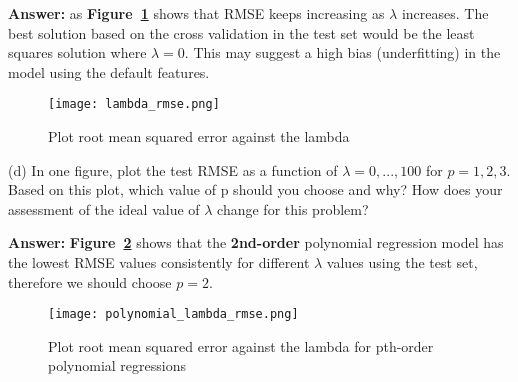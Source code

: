 \documentclass[11pt]{report}
\begin{document}
\justify
\textbf{Answer:} as \textbf{Figure~\ref{fig:ambda_rmse}} shows that RMSE keeps increasing as $\lambda$ increases. The best solution based on the cross validation in the test set would be the least squares solution where $\lambda = 0$. This may suggest a high bias (underfitting) in the model using the default features. 


\begin{figure}[h]
\texttt{[image: lambda\_rmse.png]}
\centering
\caption{Plot root mean squared error against the lambda}
\label{fig:ambda_rmse}
\end{figure}


\justify
(d) In one figure, plot the test RMSE as a function of $\lambda = 0, . . . , 100$ for $ p = 1,  2, 3$. Based on this plot, which value of p should you choose and why? How does your assessment of the ideal value of $\lambda$ change for this problem?

\justify
\textbf{Answer:}  \textbf{Figure~\ref{fig:polynomial_lambda_rmse}} shows that the \textbf{2nd-order} polynomial regression model has the lowest RMSE values consistently for different $\lambda$ values using the test set, therefore we should choose $p=2$.  

\begin{figure}[h]
\texttt{[image: polynomial\_lambda\_rmse.png]}
\centering
\caption{Plot root mean squared error against the lambda for pth-order polynomial regressions}
\label{fig:polynomial_lambda_rmse}
\end{figure}
\end{document}
